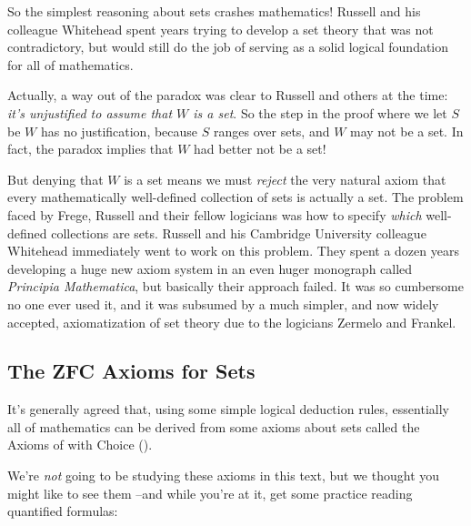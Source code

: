 
So the simplest reasoning about sets crashes mathematics!  Russell and his
colleague Whitehead spent years trying to develop a set theory that was
not contradictory, but would still do the job of serving as a solid
logical foundation for all of mathematics.

Actually, a way out of the paradox was clear to Russell and others at
the time: \emph{it's unjustified to assume that $W$ is a set}.  So the
step in the proof where we let $S$ be $W$ has no justification,
because $S$ ranges over sets, and $W$ may not be a set.  In fact, the
paradox implies that $W$ had better not be a set!

But denying that $W$ is a set means we must \emph{reject} the very natural
axiom that every mathematically well-defined collection of sets is
actually a set.  The problem faced by Frege, Russell and their fellow
logicians was how to specify \emph{which} well-defined collections are
sets.  Russell and his Cambridge University colleague Whitehead
immediately went to work on this problem.  They spent a dozen years
developing a huge new axiom system in an even huger monograph called
\emph{Principia Mathematica}, but basically their approach failed.  It was
so cumbersome no one ever used it, and it was subsumed by a much simpler,
and now widely accepted, axiomatization of set theory due to the logicians
Zermelo and Frankel.

\subsection{The ZFC Axioms for Sets}
It's generally agreed that, using some simple logical deduction rules,
essentially all of mathematics can be derived from some axioms about sets
called the Axioms of  with Choice ().

We're \emph{not} going to be studying these axioms in this text, but we
thought you might like to see them --and while you're at it, get some
practice reading quantified formulas:

